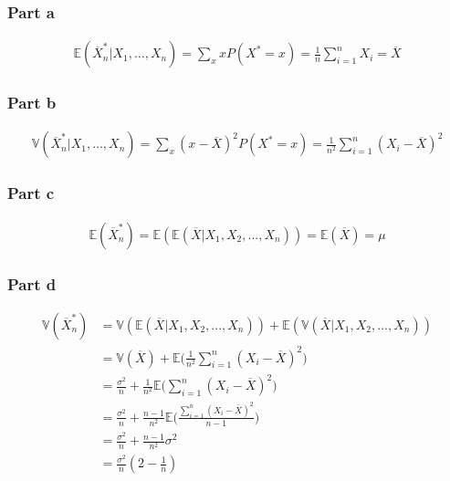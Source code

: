 \documentclass[12pt, a4paper]{book}
\begin{document}
\subsubsection*{Part a}

\begin{align*}
    \mathbb{E}(\overline{X}_n^* | X_1, \dots, X_n) =  \sum_x x P(X^*=x) = \frac{1}{n} \sum_{i=1}^{n} X_i = \overline{X}
\end{align*}

\subsubsection*{Part b}

\begin{align*}
    \mathbb{V}(\overline{X}_n^* | X_1, \dots, X_n) = \sum_x (x - \overline{X})^2 P(X^*=x) = \frac{1}{n^2} \sum_{i=1}^{n} (X_i - \overline{X})^2
\end{align*}

\subsubsection*{Part c}

\begin{align*}
    \mathbb{E}(\overline{X}_n^*) = \mathbb{E}(\mathbb{E}(\overline{X}|X_1, X_2, ..., X_n)) = \mathbb{E}(\overline{X}) = \mu
\end{align*}

\subsubsection*{Part d}

\begin{align*}
    \mathbb{V}(\overline{X}_n^*) & = \mathbb{V}(\mathbb{E}(\overline{X}|X_1, X_2, ..., X_n)) + \mathbb{E}(\mathbb{V}(\overline{X}|X_1, X_2, ..., X_n)) \\
    & = \mathbb{V}(\overline{X}) + \mathbb{E}\bigg(\frac{1}{n^2}\sum_{i=1}^{n} (X_i-\overline{X})^2\bigg) \\
    & = \frac{\sigma^2}{n} + \frac{1}{n^2} \mathbb{E} \bigg( \sum_{i=1}^{n} (X_i - \overline{X})^2 \bigg) \\
    & = \frac{\sigma^2}{n} + \frac{n-1}{n^2} \mathbb{E} \bigg( \frac{\sum_{i=1}^{n} (X_i - \overline{X})^2}{n-1} \bigg) \\
    & = \frac{\sigma^2}{n} + \frac{n-1}{n^2} \sigma^2 \\
    & = \frac{\sigma^2}{n} (2 - \frac{1}{n})
\end{align*}
\end{document}
